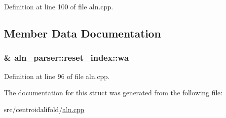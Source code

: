 Definition at line 100 of file aln.\+cpp.



\subsection{Member Data Documentation}
\hypertarget{structaln__parser_1_1reset__index_a9b302b2528d6aa1aedb06ebd572f88e4}{
\subsubsection[{wa}]{\& aln\+\_\+parser\+::reset\+\_\+index\+::wa}}\label{structaln__parser_1_1reset__index_a9b302b2528d6aa1aedb06ebd572f88e4}


Definition at line 96 of file aln.\+cpp.



The documentation for this struct was generated from the following file\+:\begin{DoxyCompactItemize}
\item 
src/centroidalifold/\hyperlink{aln_8cpp}{aln.\+cpp}\end{DoxyCompactItemize}

